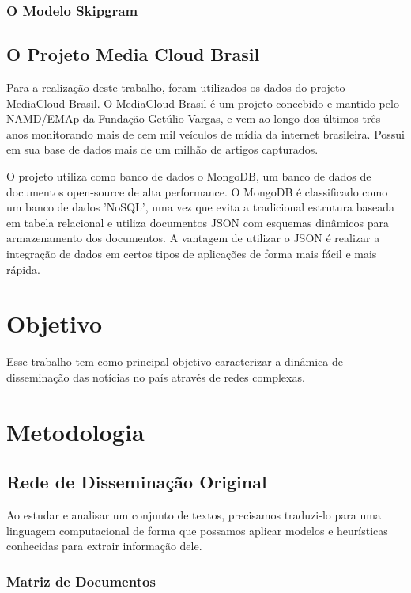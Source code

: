 \documentclass[a4paper,12pt]{article}
\begin{document}
\subsubsection{O Modelo Skipgram}

\subsection{O Projeto Media Cloud Brasil}

Para a realização deste trabalho, foram utilizados os dados do projeto MediaCloud Brasil. O MediaCloud Brasil é um projeto concebido e mantido pelo
NAMD/EMAp da Fundação Getúlio Vargas, e vem ao longo dos últimos três anos monitorando mais de cem mil veículos de mídia da internet brasileira. Possui em
sua base de dados mais de um milhão de artigos capturados.

O projeto utiliza como banco de dados o MongoDB, um banco de dados de documentos open-source de alta performance. O MongoDB é classificado como um banco de 
dados 'NoSQL', uma vez que evita a tradicional estrutura  baseada em tabela relacional e utiliza documentos JSON com esquemas dinâmicos para armazenamento 
dos documentos. A vantagem de utilizar o JSON é realizar a integração de dados em certos tipos de aplicações de forma mais fácil e mais rápida.

\section{Objetivo}

Esse trabalho tem como principal objetivo caracterizar a dinâmica de disseminação das notícias no país através de redes complexas.

\section{Metodologia}

\subsection{Rede de Disseminação Original}

Ao estudar e analisar um conjunto de textos, precisamos traduzi-lo para uma linguagem computacional de forma que possamos aplicar modelos e heurísticas 
conhecidas para extrair informação dele.

\subsubsection{Matriz de Documentos}
\end{document}
